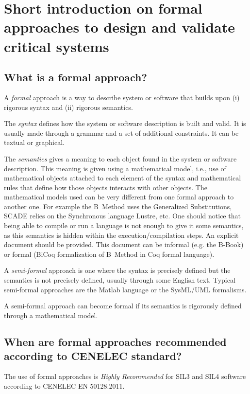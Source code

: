 

\section{Short introduction on formal approaches to  design and validate critical systems}
\label{sec:formalIntro}

\subsection{What is a formal approach?}

A \emph{formal} approach is a way to describe system or software
that builds upon (i) rigorous syntax and (ii) rigorous semantics.

The \emph{syntax} defines how the system or software description is
built and valid. It is usually made through a grammar and a set of
additional constraints. It can be textual or graphical.

The \emph{semantics} gives a meaning to each object found in the
system or software description. This meaning is given using a
mathematical model, i.e., use of mathematical objects attached to each
element of the syntax and mathematical rules that define how those
objects interacts with other objects. The mathematical models used can
be very different from one formal approach to another one. For example
the B~Method uses the Generalized Substitutions, SCADE relies on the
Synchronous language Lustre, etc. One should notice that being able to
compile or run a language is not enough to give it some semantics, as
this semantics is hidden within the execution/compilation steps. An
explicit document should be provided. This document can be informal
(e.g. the B-Book) or formal (BiCoq formalization of B~Method in Coq
formal language).

A \emph{semi-formal} approach is one where the syntax is precisely
defined but the semantics is not precisely defined, usually through some
English text. Typical semi-formal approaches are the Matlab language or
the SysML/UML formalisms.

A semi-formal approach can become formal if its semantics is
rigorously defined through a mathematical model.

\subsection{When are formal approaches recommended according to CENELEC standard?}

The use of formal approaches is \emph{Highly Recommended} for SIL3 and
SIL4 software according to CENELEC EN 50128:2011.

